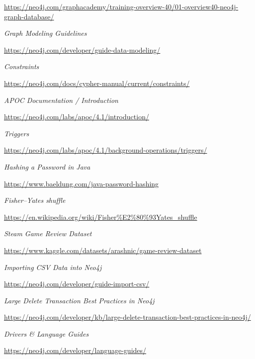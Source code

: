 \documentclass[12pt,a4paper]{report}
\begin{document}
\begin{thebibliography}{9}
  \url{https://neo4j.com/graphacademy/training-overview-40/01-overview40-neo4j-graph-database/}
  
  
  \textit{Graph Modeling Guidelines}
  
  \url{https://neo4j.com/developer/guide-data-modeling/}
  
  
  \textit{Constraints}
  
  \url{https://neo4j.com/docs/cypher-manual/current/constraints/}
  
  
  \textit{APOC Documentation / Introduction}
  
  \url{https://neo4j.com/labs/apoc/4.1/introduction/}
  
  
  \textit{Triggers}
  
  \url{https://neo4j.com/labs/apoc/4.1/background-operations/triggers/}
  
  
  \textit{Hashing a Password in Java}
  
  \url{https://www.baeldung.com/java-password-hashing}
  
  
  \textit{Fisher–Yates shuffle}
  
  \url{https://en.wikipedia.org/wiki/Fisher%E2%80%93Yates_shuffle}
  
  
  \textit{Steam Game Review Dataset}
  
  \url{https://www.kaggle.com/datasets/arashnic/game-review-dataset}
  
  
  \textit{Importing CSV Data into Neo4j}
  
  \url{https://neo4j.com/developer/guide-import-csv/}
  
  
  \textit{Large Delete Transaction Best Practices in Neo4j}
  
  \url{https://neo4j.com/developer/kb/large-delete-transaction-best-practices-in-neo4j/}
  
  
  \textit{Drivers \& Language Guides}
  
  \url{https://neo4j.com/developer/language-guides/}
  
  

\end{thebibliography}
\end{document}
